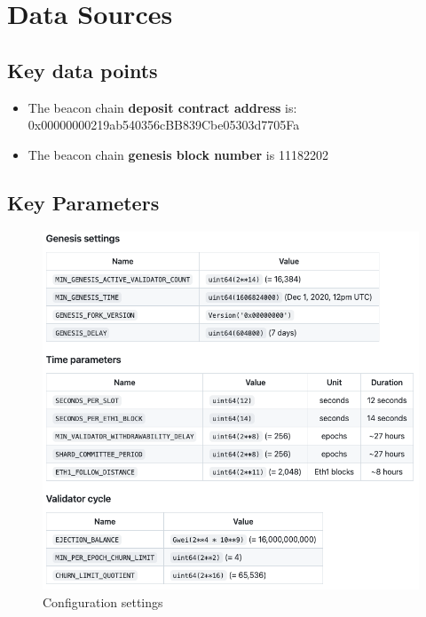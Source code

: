 \documentclass[UTF8]{article}
\begin{document}
\section{Data Sources}
\label{sec:sources}
\subsection{Key data points}
\begin{itemize}
\item The beacon chain \textbf{deposit contract address} is: 0x00000000219ab540356cBB839Cbe05303d7705Fa 
\item The beacon chain \textbf{genesis block number} is 11182202
\end{itemize}

 \subsection{Key Parameters }
\begin{figure}[htbp]
\begin{center}
\includegraphics[width=0.9\linewidth]{images/configvalues}
\caption{Configuration settings}
\label{fig:config}
\end{center}
\end{figure}
\end{document}
